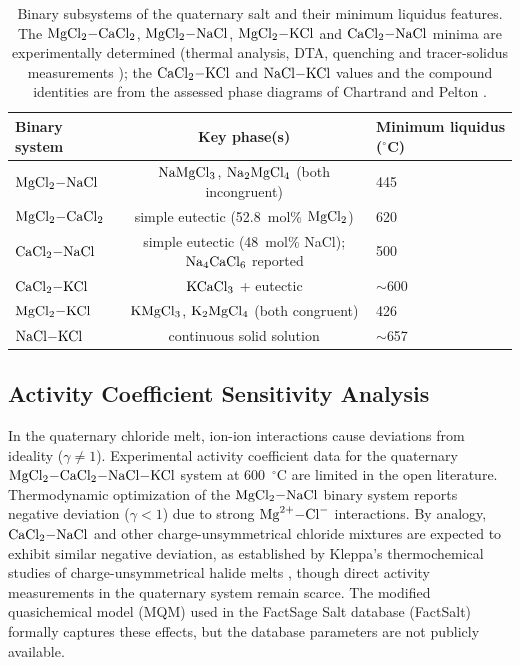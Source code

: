 \documentclass[pdflatex,sn-basic,Numbered]{sn-jnl}
\begin{document}
\begin{table}[!ht]
\centering
\footnotesize
\caption{Binary subsystems of the quaternary salt and their minimum liquidus features. The $\ce{MgCl2-CaCl2}$, $\ce{MgCl2-NaCl}$, $\ce{MgCl2-KCl}$ and $\ce{CaCl2-NaCl}$ minima are experimentally determined (thermal analysis, DTA, quenching and tracer-solidus measurements \cite{grjotheim1970,grjotheim1972,seltveit1958}); the $\ce{CaCl2-KCl}$ and $\ce{NaCl-KCl}$ values and the compound identities are from the assessed phase diagrams of Chartrand and Pelton \cite{chartrand2000}.}
\label{tab:binary}
\begin{tabular}{lcl}
\toprule
Binary system & Key phase(s) & Minimum liquidus ($^{\circ}$C) \\
\midrule
$\ce{MgCl2-NaCl}$ & $\ce{NaMgCl3}$, $\ce{Na2MgCl4}$ (both incongruent) & 445 \\
$\ce{MgCl2-CaCl2}$ & simple eutectic (52.8~mol\% $\ce{MgCl2}$) & 620 \\
$\ce{CaCl2-NaCl}$ & simple eutectic (48~mol\% NaCl); $\ce{Na4CaCl6}$ reported & 500 \\
$\ce{CaCl2-KCl}$ & $\ce{KCaCl3}$ + eutectic & $\sim$600 \\
$\ce{MgCl2-KCl}$ & $\ce{KMgCl3}$, $\ce{K2MgCl4}$ (both congruent) & 426 \\
$\ce{NaCl-KCl}$ & continuous solid solution & $\sim$657 \\
\bottomrule
\end{tabular}
\end{table}

\subsection{Activity Coefficient Sensitivity Analysis}
\label{subsec:activity}

In the quaternary chloride melt, ion-ion interactions cause deviations from ideality ($\gamma \neq 1$). Experimental activity coefficient data for the quaternary $\ce{MgCl2-CaCl2-NaCl-KCl}$ system at 600~$^{\circ}$C are limited in the open literature. Thermodynamic optimization of the $\ce{MgCl2-NaCl}$ binary system \cite{chartrand2000} reports negative deviation ($\gamma < 1$) due to strong $\ce{Mg^{2+}-Cl^{-}}$ interactions. By analogy, $\ce{CaCl2-NaCl}$ and other charge-unsymmetrical chloride mixtures are expected to exhibit similar negative deviation, as established by Kleppa's thermochemical studies of charge-unsymmetrical halide melts \cite{kleppa1966}, though direct activity measurements in the quaternary system remain scarce. The modified quasichemical model (MQM) used in the FactSage Salt database (FactSalt) \cite{pelton2000mqm} formally captures these effects, but the database parameters are not publicly available.
\end{document}
